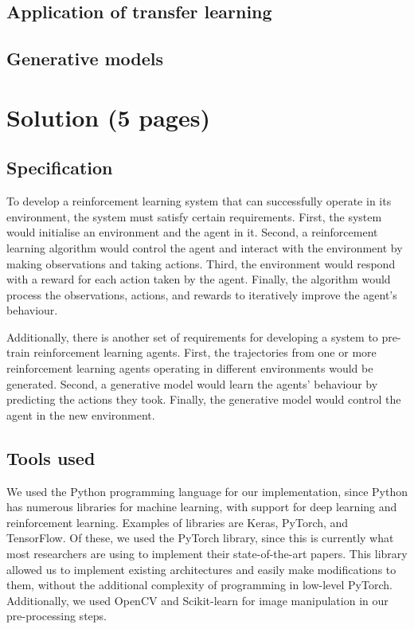 \documentclass[12pt,a4paper]{article}
\begin{document}
\subsection{Application of transfer learning }

\subsection{Generative models}

\newpage
\section{Solution (5 pages)}
\subsection{Specification}
To develop a reinforcement learning system that can successfully operate in its environment, the system must satisfy certain requirements. First, the system would initialise an environment and the agent in it. Second, a reinforcement learning algorithm would control the agent and interact with the environment by making observations and taking actions. Third, the environment would respond with a reward for each action taken by the agent. Finally, the algorithm would process the observations, actions, and rewards to iteratively improve the agent's behaviour.  

Additionally, there is another set of requirements for developing a system to pre-train reinforcement learning agents. First, the trajectories from one or more reinforcement learning agents operating in different environments would be generated. Second, a generative model would learn the agents' behaviour by predicting the actions they took. Finally, the generative model would control the agent in the new environment.  

\subsection{Tools used}
We used the Python programming language for our implementation, since Python has numerous libraries for machine learning, with support for deep learning and reinforcement learning. Examples of libraries are Keras, PyTorch, and TensorFlow. Of these, we used the PyTorch library, since this is currently what most researchers are using to implement their state-of-the-art papers. This library allowed us to implement existing architectures and easily make modifications to them, without the additional complexity of programming in low-level PyTorch. Additionally, we used OpenCV and Scikit-learn for image manipulation in our pre-processing steps.
\end{document}

